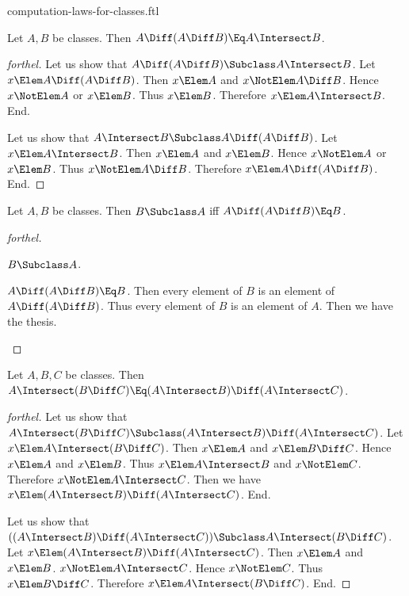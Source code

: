 \documentclass{stex}
\begin{document}
\begin{smodule}{computation-laws-for-classes.ftl}
\begin{proposition*}[forthel]
  Let $A, B$ be classes.
  Then $A \Diff (A \Diff B) \Eq A \Intersect B$.
\end{proposition*}
\begin{proof}[forthel]
  Let us show that $A \Diff (A \Diff B) \Subclass A \Intersect B$.
    Let $x \Elem A \Diff (A \Diff B)$.
    Then $x \Elem A$ and $x \NotElem A \Diff B$.
    Hence $x \NotElem A$ or $x \Elem B$.
    Thus $x \Elem B$.
    Therefore $x \Elem A \Intersect B$.
  End.

  Let us show that $A \Intersect B \Subclass A \Diff (A \Diff B)$.
    Let $x \Elem A \Intersect B$.
    Then $x \Elem A$ and $x \Elem B$.
    Hence $x \NotElem A$ or $x \Elem B$.
    Thus $x \NotElem A \Diff B$.
    Therefore $x \Elem A \Diff (A \Diff B)$.
  End.
\end{proof}

\begin{proposition*}[forthel]
  Let $A, B$ be classes.
  Then $B \Subclass A$ iff $A \Diff (A \Diff B) \Eq B$.
\end{proposition*}
\begin{proof}[forthel]
  \begin{case}{$B \Subclass A$.} \end{case}

  \begin{case}{$A \Diff (A \Diff B) \Eq B$.}
    Then every element of $B$ is an element of $A \Diff (A \Diff B)$.
    Thus every element of $B$ is an element of $A$.
    Then we have the thesis.
  \end{case}
\end{proof}

\begin{proposition*}[forthel]
  Let $A, B, C$ be classes.
  Then $A \Intersect (B \Diff C) \Eq (A \Intersect B) \Diff (A \Intersect C)$.
\end{proposition*}
\begin{proof}[forthel]
  Let us show that $A \Intersect (B \Diff C) \Subclass (A \Intersect B) \Diff (A \Intersect C)$.
    Let $x \Elem A \Intersect (B \Diff C)$.
    Then $x \Elem A$ and $x \Elem B \Diff C$.
    Hence $x \Elem A$ and $x \Elem B$.
    Thus $x \Elem A \Intersect B$ and $x \NotElem C$.
    Therefore $x \NotElem A \Intersect C$.
    Then we have $x \Elem (A \Intersect B) \Diff (A \Intersect C)$.
  End.

  Let us show that $((A \Intersect B) \Diff (A \Intersect C)) \Subclass A \Intersect (B \Diff C)$. %
    Let $x \Elem (A \Intersect B) \Diff (A \Intersect C)$.
    Then $x \Elem A$ and $x \Elem B$.
    $x \NotElem A \Intersect C$.
    Hence $x \NotElem C$.
    Thus $x \Elem B \Diff C$.
    Therefore $x \Elem A \Intersect (B \Diff C)$.
  End.
\end{proof}

\end{smodule}
\end{document}
